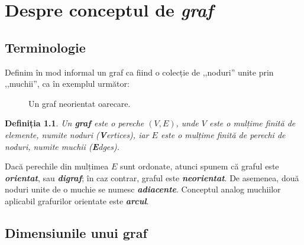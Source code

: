 \documentclass[9pt,a4paper]{report}
\newtheorem{definitie}{Definiția}
\begin{document}
\newpage
\setcounter{page}{1}

\chapter{Despre conceptul de \textit{graf}}
\section{Terminologie}

Definim în mod informal un graf ca fiind o colecție de ,,noduri'' unite prin ,,muchii'', ca în exemplul următor:

\begin{figure}[htbp]
    \centering
    \caption{Un graf neorientat oarecare.}
    \label{fig:graf1}
\end{figure}

\begin{definitie}
    Un \textbf{graf} este o pereche $(V,E)$, unde $V$ este o mulțime finită de elemente, numite \textit{noduri (\textbf{V}ertices)}, iar $E$ este o mulțime finită de perechi de noduri, numite \textit{muchii (\textbf{E}dges)}.
\end{definitie}

Dacă perechile din mulțimea $E$ sunt ordonate, atunci spunem că graful este \textbf{\textit{orientat}}, sau \textbf{\textit{digraf}}; în caz contrar, graful este \textbf{\textit{neorientat}}. De asemenea, două noduri unite de o muchie se numesc \textit{\textbf{adiacente}}. Conceptul analog muchiilor aplicabil grafurilor orientate este \textbf{\textit{arcul}}.

\section{Dimensiunile unui graf}
\end{document}
